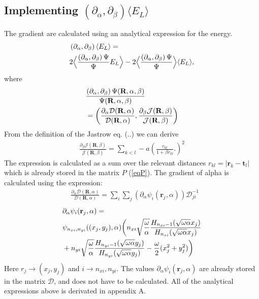 \documentclass[a4paper,10pt,twocolumn]{article} %
\newcommand{\ts}[1]{\textbf{#1}}
\newcommand{\expec}[1]{\langle{}{#1}\rangle{}}
\begin{document}
\subsection{Implementing $(\partial_\alpha,\partial_\beta)\expec{E_L}$}%
The gradient are calculated using an analytical expression for the energy. 
\cite{lin_2000}
\begin{align}
	&\left({\partial_\alpha},{\partial_\beta}\right) \expec{E_L} = \notag\\
		&2\Big\langle\frac{\left({\partial_\alpha},{\partial_\beta}\right)\Psi}{\Psi} E_L\Big\rangle
		-2\Big\langle\frac{\left({\partial_\alpha},{\partial_\beta}\right)\Psi}{\Psi}\Big\rangle\expec{E_L}\label{abgd},
\end{align}
where
\begin{align}
	&\frac{\left({\partial_\alpha},{\partial_\beta}\right) \Psi(\ts R,\alpha,\beta)}{\Psi(\ts R,\alpha,\beta)}\notag\\
	&= 	\left(\frac{\partial_\alpha \mathcal D(\ts R,\alpha)}{\mathcal D(\ts R,\alpha)}
	, 	\frac{{\partial_\beta} \mathcal J(\ts R,\beta)}{\mathcal J(\ts R,\beta)}\right)
\end{align}
From the definition of the Jastrow eq. (..) we can derive
\begin{align}
	\frac{\partial_\beta \mathcal J(\ts R,\beta)}{ \mathcal J(\ts R,\beta)}=\sum_{k<l}-a
\left( 
	\frac {r_{kl}} {1+\beta r_{kl}}.
\right)^2
\end{align}
The expression is calculated as a sum over the relevant distances $r_{kl}=|\ts r_k-\ts t_l|$ which is already stored in the matrix $P$ (\ref{eqP}).
The gradient of alpha is calculated using the expression:
\begin{align}
	&\frac{\partial_\alpha \mathcal D(\ts R,\alpha)}{\mathcal D(\ts R,\alpha)}=\sum_i\sum_j(\partial_\alpha \psi_i(\ts r_j,\alpha)) \mathcal D^{-1}_{ji} %
\end{align}
\begin{align}
	&\partial_\alpha \psi_i(\ts r_j,\alpha)=\notag\\
	&\psi_{n_{xi},n_{yi}}((x_j,y_j),\alpha)
	\bigg(
	 	n_{xi} \sqrt{\frac\omega\alpha} \frac{H_{n_{xi}-1}(\sqrt{\omega\alpha}x_j)}{H_{n_{xi}}(\sqrt{\omega\alpha}x_j)}\notag\\
	 	&+n_{yi} \sqrt{\frac\omega\alpha} \frac{H_{n_{yi}-1}(\sqrt{\omega\alpha}y_j)}{H_{n_{yi}}(\sqrt{\omega\alpha}y_j)}
		-\frac{\omega}2(x_j^2+y_j^2)
	\bigg)
\end{align}
Here $r_j\to(x_j,y_j)$ and $i\to n_{xi},n_{yi}$.  
The values 	$\partial_\alpha \psi_i(\ts r_j,\alpha)$ are already stored in the matrix $\mathcal D$, and does not have to be calculated. 
All of the analytical expressions above is derivated in appendix A.
\end{document}
